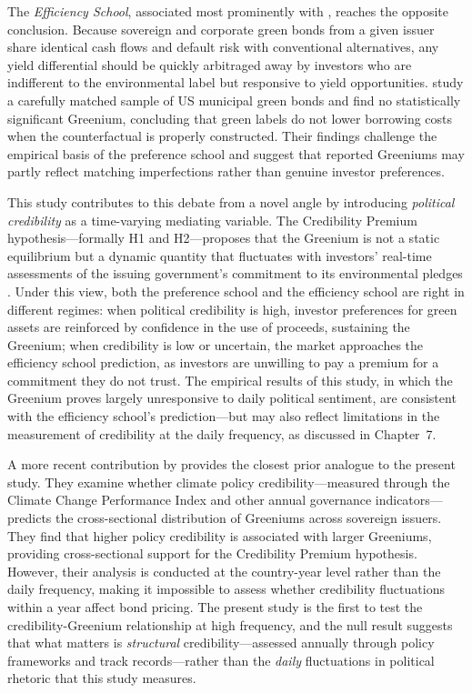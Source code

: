 \documentclass[12pt,a4paper]{article}
\begin{document}
The \textit{Efficiency School}, associated most prominently with \citet{Larcker2020}, reaches the opposite conclusion. Because sovereign and corporate green bonds from a given issuer share identical cash flows and default risk with conventional alternatives, any yield differential should be quickly arbitraged away by investors who are indifferent to the environmental label but responsive to yield opportunities. \citet{Larcker2020} study a carefully matched sample of US municipal green bonds and find no statistically significant Greenium, concluding that green labels do not lower borrowing costs when the counterfactual is properly constructed. Their findings challenge the empirical basis of the preference school and suggest that reported Greeniums may partly reflect matching imperfections rather than genuine investor preferences.

This study contributes to this debate from a novel angle by introducing \textit{political credibility} as a time-varying mediating variable. The Credibility Premium hypothesis---formally H1 and H2---proposes that the Greenium is not a static equilibrium but a dynamic quantity that fluctuates with investors' real-time assessments of the issuing government's commitment to its environmental pledges \citep{Lau2024}. Under this view, both the preference school and the efficiency school are right in different regimes: when political credibility is high, investor preferences for green assets are reinforced by confidence in the use of proceeds, sustaining the Greenium; when credibility is low or uncertain, the market approaches the efficiency school prediction, as investors are unwilling to pay a premium for a commitment they do not trust. The empirical results of this study, in which the Greenium proves largely unresponsive to daily political sentiment, are consistent with the efficiency school's prediction---but may also reflect limitations in the measurement of credibility at the daily frequency, as discussed in Chapter~7.

A more recent contribution by \citet{Lau2024} provides the closest prior analogue to the present study. They examine whether climate policy credibility---measured through the Climate Change Performance Index and other annual governance indicators---predicts the cross-sectional distribution of Greeniums across sovereign issuers. They find that higher policy credibility is associated with larger Greeniums, providing cross-sectional support for the Credibility Premium hypothesis. However, their analysis is conducted at the country-year level rather than the daily frequency, making it impossible to assess whether credibility fluctuations within a year affect bond pricing. The present study is the first to test the credibility-Greenium relationship at high frequency, and the null result suggests that what matters is \textit{structural} credibility---assessed annually through policy frameworks and track records---rather than the \textit{daily} fluctuations in political rhetoric that this study measures.
\end{document}
